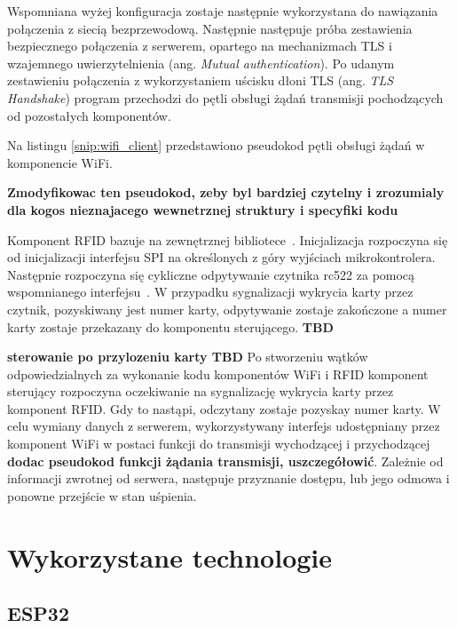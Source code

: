                 Wspomniana wyżej konfiguracja zostaje następnie wykorzystana do nawiązania połączenia z siecią bezprzewodową. Następnie następuje próba zestawienia bezpiecznego połączenia z serwerem, opartego na mechanizmach TLS i wzajemnego uwierzytelnienia (ang. \textit{Mutual authentication}). Po udanym zestawieniu połączenia z wykorzystaniem uścisku dłoni TLS (ang. \textit{TLS Handshake}) program przechodzi do pętli obsługi żądań transmisji pochodzących od pozostałych komponentów.

                Na listingu \ref{snip:wifi_client} przedstawiono pseudokod pętli obsługi żądań w komponencie WiFi.

                \textbf{Zmodyfikowac ten pseudokod, zeby byl bardziej czytelny i zrozumialy dla kogos nieznajacego wewnetrznej struktury i specyfiki kodu}
                

                Komponent RFID bazuje na zewnętrznej bibliotece~\cite{esp-idf-rc522}. Inicjalizacja rozpoczyna się od inicjalizacji interfejsu SPI na określonych z góry wyjściach mikrokontrolera. Następnie rozpoczyna się cykliczne odpytywanie czytnika rc522 za pomocą wspomnianego interfejsu~\cite{esp-idf-rc522}. W przypadku sygnalizacji wykrycia karty przez czytnik, pozyskiwany jest numer karty, odpytywanie zostaje zakończone a numer karty zostaje przekazany do komponentu sterującego. \textbf{TBD}

                \textbf{sterowanie po przylozeniu karty TBD}
                Po stworzeniu wątków odpowiedzialnych za wykonanie kodu komponentów WiFi i RFID komponent sterujący rozpoczyna oczekiwanie na sygnalizację wykrycia karty przez komponent RFID. Gdy to nastąpi, odczytany zostaje pozyskay numer karty. W celu wymiany danych z serwerem, wykorzystywany interfejs udostępniany przez komponent WiFi w postaci funkcji do transmisji wychodzącej i przychodzącej \textbf{dodac pseudokod funkcji żądania transmisji, uszczegółowić}. Zależnie od informacji zwrotnej od serwera, następuje przyznanie dostępu, lub jego odmowa i ponowne przejście w stan uśpienia.

    \section {Wykorzystane technologie}

        \subsection{ESP32}

